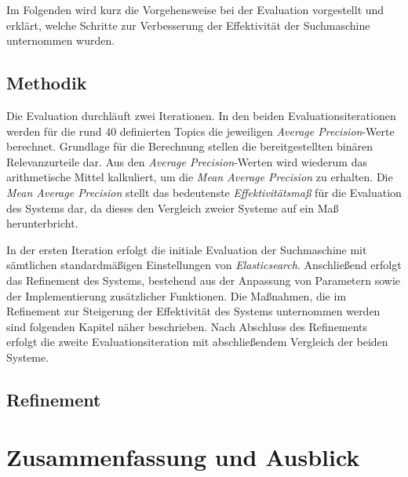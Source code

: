 \documentclass[11pt,a4paper, halfparskip]{scrartcl}
\begin{document}
Im Folgenden wird kurz die Vorgehensweise bei der Evaluation vorgestellt und erklärt, welche Schritte zur Verbesserung der Effektivität der Suchmaschine unternommen wurden.

\subsection{Methodik}

Die Evaluation durchläuft zwei Iterationen.
In den beiden Evaluationsiterationen werden für die rund 40 definierten Topics die jeweiligen \textit{Average Precision}-Werte berechnet. 
Grundlage für die Berechnung stellen die bereitgestellten binären Relevanzurteile dar.
Aus den \textit{Average Precision}-Werten wird wiederum das arithmetische Mittel kalkuliert, um die \textit{Mean Average Precision} zu erhalten.
Die \textit{Mean Average Precision} stellt das bedeutenste \textit{Effektivitätsmaß} für die Evaluation des Systems dar, da dieses den Vergleich zweier Systeme auf ein Maß herunterbricht.

In der ersten Iteration erfolgt die initiale Evaluation der Suchmaschine mit sämtlichen standardmäßigen Einstellungen von \textit{Elasticsearch}.
Anschließend erfolgt das Refinement des Systems, bestehend aus der Anpassung von Parametern sowie der Implementierung zusätzlicher Funktionen. 
Die Maßnahmen, die im Refinement zur Steigerung der Effektivität des Systems unternommen werden sind folgenden Kapitel näher beschrieben. 
Nach Abschluss des Refinements erfolgt die zweite Evaluationsiteration mit abschließendem Vergleich der beiden Systeme. 

\subsection{Refinement}

\section{Zusammenfassung und Ausblick}

\end{document}
